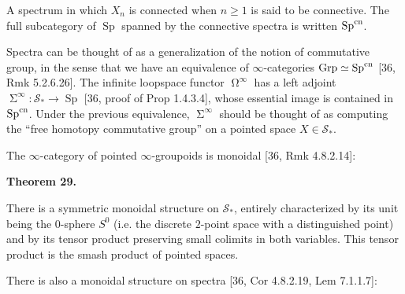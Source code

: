 \documentclass[10pt,a4paper]{article}
\begin{document}
 
A spectrum in which $X_{n}$ is connected when $n\geq 1$ is said to be connective. The full subcategory of $\operatorname{Sp}$ spanned by the connective spectra is written $\operatorname{Sp}^{\textnormal{cn}}$.\par
 
 
 
 
Spectra can be thought of as a generalization of the notion of commutative group, in the sense that we have an equivalence of $\infty$-categories $\operatorname{Grp}\simeq\operatorname{Sp}^{\textnormal{cn}}$ [36, Rmk 5.2.6.26]. The infinite loopspace functor $\operatorname{\Omega}^{\infty}$ has a left adjoint $\operatorname{\Sigma}^{\infty}:{\mathcal{S}}_{*}\to\operatorname{Sp}$ [36, proof of Prop 1.4.3.4], whose essential image is contained in $\operatorname{Sp}^{\textnormal{cn}}$. Under the previous equivalence, $\operatorname{\Sigma}^{\infty}$ should be thought of as computing the “free homotopy commutative group” on a pointed space $X\in{\mathcal{S}}_{*}$.\par
 
 
 
The $\infty$-category of pointed $\infty$-groupoids is monoidal [36, Rmk 4.8.2.14]:\par
 
 
 
\par\medskip\noindent\textbf{Theorem 29.}\par
 
 
There is a symmetric monoidal structure on ${\mathcal{S}}_{*}$, entirely characterized by its unit being the $0$-sphere $S^{0}$ (i.e. the discrete $2$-point space with a distinguished point) and by its tensor product preserving small colimits in both variables. This tensor product is the smash product of pointed spaces.\par
 
 
 
 
There is also a monoidal structure on spectra [36, Cor 4.8.2.19, Lem 7.1.1.7]:\par
 
\end{document}
